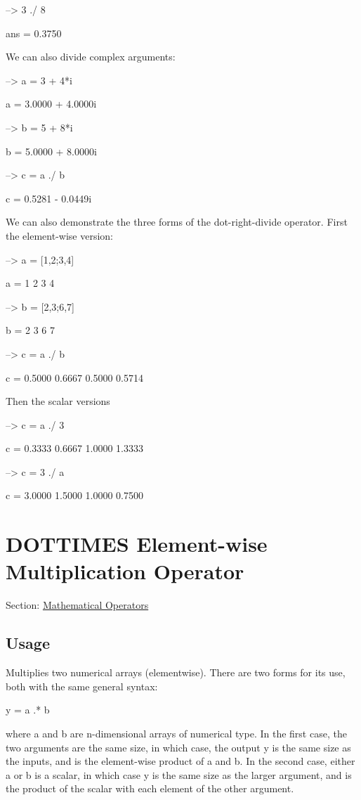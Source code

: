 \begin{DoxyVerbInclude}
--> 3 ./ 8

ans = 
    0.3750 
\end{DoxyVerbInclude}


We can also divide complex arguments\-:


\begin{DoxyVerbInclude}
--> a = 3 + 4*i

a = 
   3.0000 +  4.0000i 

--> b = 5 + 8*i

b = 
   5.0000 +  8.0000i 

--> c = a ./ b

c = 
   0.5281 -  0.0449i 
\end{DoxyVerbInclude}


We can also demonstrate the three forms of the dot-\/right-\/divide operator. First the element-\/wise version\-:


\begin{DoxyVerbInclude}
--> a = [1,2;3,4]

a = 
 1 2 
 3 4 

--> b = [2,3;6,7]

b = 
 2 3 
 6 7 

--> c = a ./ b

c = 
    0.5000    0.6667 
    0.5000    0.5714 
\end{DoxyVerbInclude}


Then the scalar versions


\begin{DoxyVerbInclude}
--> c = a ./ 3

c = 
    0.3333    0.6667 
    1.0000    1.3333 

--> c = 3 ./ a

c = 
    3.0000    1.5000 
    1.0000    0.7500 
\end{DoxyVerbInclude}
 \hypertarget{operators_dottimes}{}\section{D\-O\-T\-T\-I\-M\-E\-S Element-\/wise Multiplication Operator}\label{operators_dottimes}
Section\-: \hyperlink{sec_operators}{Mathematical Operators} \hypertarget{vtkwidgets_vtkxyplotwidget_Usage}{}\subsection{Usage}\label{vtkwidgets_vtkxyplotwidget_Usage}
Multiplies two numerical arrays (elementwise). There are two forms for its use, both with the same general syntax\-: \begin{DoxyVerb}  y = a .* b
\end{DoxyVerb}
 where {\ttfamily a} and {\ttfamily b} are {\ttfamily n}-\/dimensional arrays of numerical type. In the first case, the two arguments are the same size, in which case, the output {\ttfamily y} is the same size as the inputs, and is the element-\/wise product of {\ttfamily a} and {\ttfamily b}. In the second case, either {\ttfamily a} or {\ttfamily b} is a scalar, in which case {\ttfamily y} is the same size as the larger argument, and is the product of the scalar with each element of the other argument.

